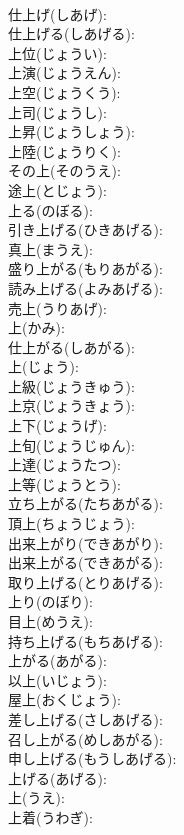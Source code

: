\documentclass[8pt]{extreport}
\begin{document}
\begin{CJK}{UTF8}{min}
\\	仕上げ(しあげ): 
\\	仕上げる(しあげる): 
\\	上位(じょうい): 
\\	上演(じょうえん): 
\\	上空(じょうくう): 
\\	上司(じょうし): 
\\	上昇(じょうしょう): 
\\	上陸(じょうりく): 
\\	その上(そのうえ): 
\\	途上(とじょう): 
\\	上る(のぼる): 
\\	引き上げる(ひきあげる): 
\\	真上(まうえ): 
\\	盛り上がる(もりあがる): 
\\	読み上げる(よみあげる): 
\\	売上(うりあげ): 
\\	上(かみ): 
\\	仕上がる(しあがる): 
\\	上(じょう): 
\\	上級(じょうきゅう): 
\\	上京(じょうきょう): 
\\	上下(じょうげ): 
\\	上旬(じょうじゅん): 
\\	上達(じょうたつ): 
\\	上等(じょうとう): 
\\	立ち上がる(たちあがる): 
\\	頂上(ちょうじょう): 
\\	出来上がり(できあがり): 
\\	出来上がる(できあがる): 
\\	取り上げる(とりあげる): 
\\	上り(のぼり): 
\\	目上(めうえ): 
\\	持ち上げる(もちあげる): 
\\	上がる(あがる): 
\\	以上(いじょう): 
\\	屋上(おくじょう): 
\\	差し上げる(さしあげる): 
\\	召し上がる(めしあがる): 
\\	申し上げる(もうしあげる): 
\\	上げる(あげる): 
\\	上(うえ): 
\\	上着(うわぎ): 

\end{CJK}
\end{document}
